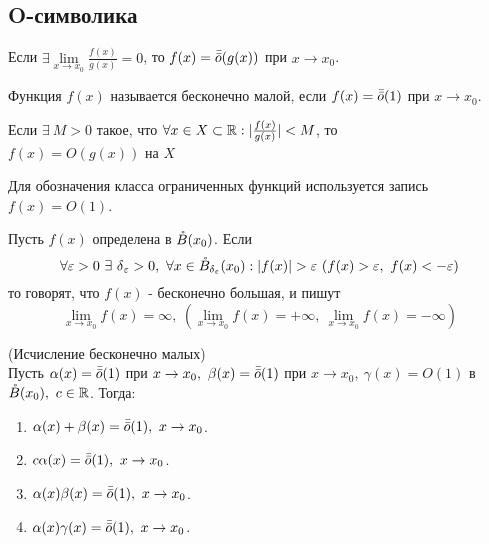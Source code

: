     \subsection{O-символика}
        \begin{definition}
            Если $\exists \lim\limits_{x\to x_0}\frac{f(x)}{g(x)}=0$, то $f(x)=\bar{\bar{o}}(g(x))$ при $x\to x_0$.
        \end{definition} 
        \begin{definition}
            Функция $f(x)$ называется бесконечно малой, если $f(x)=\bar{\bar{o}}(1)$ при $x\to x_0$.
        \end{definition}
        \begin{definition}
            Если $\exists\ M>0$ такое, что $\forall x\in X\subset \mathbb{R}: |\frac{f(x)}{g(x)}|<M$, то\\
            $f(x)=O(g(x))$ на $X$
        \end{definition} 
        \begin{definition}
            Для обозначения класса ограниченных функций используется запись $f(x)=O(1)$.
        \end{definition}
        \begin{definition}
            Пусть $f(x)$ определена в $\mathring{B}(x_0)$. Если 
            \[\forall \epsilon>0\ \exists\ \delta{_\epsilon}>0,\ \forall x\in \Bo_{\delta_{\epsilon}}(x_0): |f(x)|>\epsilon\ (f(x)>\epsilon,\ f(x)<-\epsilon)\] то говорят, что $f(x)$ - бесконечно большая, и пишут
            \[\lim\limits_{x\to x_0}f(x)=\infty,\ (\lim\limits_{x\to x_0}f(x)=+\infty,\ \lim\limits_{x\to x_0}f(x)=-\infty)\]
        \end{definition}
        \begin{theorem} (Исчисление бесконечно малых)\\
            Пусть $\alpha(x)=\bar{\bar{o}}(1)$ при $x\to x_0,\ \beta(x)=\bar{\bar{o}}(1)$ при $x\to x_0,\ \gamma(x)=O(1)$ в $\mathring{B}(x_0),\ c\in \mathbb{R}$. Тогда:
            \begin{enumerate}
                \item $\alpha(x)+\beta(x)=\bar{\bar{o}}(1),\ x\to x_0$.
                \item $c \alpha(x)=\bar{\bar{o}}(1),\ x\to x_0$.
                \item $\alpha(x)\beta(x)=\bar{\bar{o}}(1),\ x\to x_0$.
                \item $\alpha(x)\gamma(x)=\bar{\bar{o}}(1),\ x\to x_0$.
            \end{enumerate}
        \end{theorem} 
